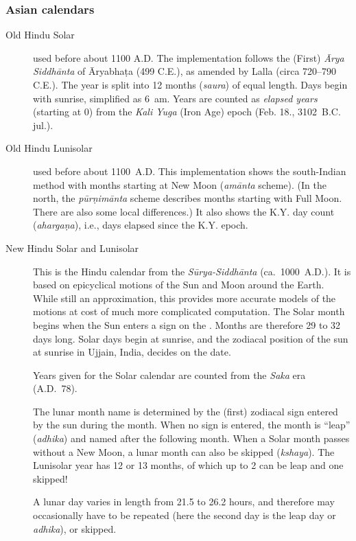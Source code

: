 \subsubsection{Asian calendars}
\begin{description}
\item[Old Hindu Solar] used before about 1100 A.D. The implementation
  follows the (First) \emph{\=Arya Siddh\=anta} of \=Aryabha\d{t}a
  (499 C.E.), as amended by Lalla (circa 720--790 C.E.).  The year is
  split into 12 months (\emph{saura}) of equal length.  Days begin
  with sunrise, simplified as 6~am. Years are counted as \emph{elapsed years} (starting at 0) from the
  \emph{Kali Yuga} (Iron Age) epoch (Feb. 18., 3102~B.C. jul.).
\item[Old Hindu Lunisolar] used before about 1100~A.D. 
  This implementation shows the south-Indian method 
  with months starting at New Moon (\emph{am\=anta} scheme). 
  (In the north, the \emph{p\=ur\d{n}im\=anta} scheme describes months 
  starting with Full Moon. There are also some local differences.) 
  It also shows the K.Y. day count (\emph{aharga\d{n}a}), i.e., days elapsed since the K.Y. epoch.
\item[New Hindu Solar and Lunisolar] This is the Hindu
  calendar from the \emph{S\=urya-Siddh\=anta}
  (ca.~1000~A.D.). It is based on epicyclical motions of the Sun and
  Moon around the Earth. While still an approximation, this provides
  more accurate models of the motions at cost of much more complicated
  computation.  The Solar month begins when the Sun enters a sign on
  the . Months are
  therefore 29 to 32 days long. Solar days begin at sunrise, and the
  zodiacal position of the sun at sunrise in Ujjain, India, decides on
  the date.

  Years given for the Solar calendar are counted from the \emph{Saka}
  era (A.D.~78).

  The lunar month name is determined by the (first) zodiacal sign
  entered by the sun during the month. When no sign is entered, the
  month is ``leap'' (\emph{adhika}) and named after the following
  month. When a Solar month passes without a New Moon, a lunar month
  can also be skipped (\emph{kshaya}).  The Lunisolar year has 12 or
  13 months, of which up to 2 can be leap and one skipped!

  A lunar day varies in length from 21.5 to 26.2 hours, and therefore
  may occasionally have to be repeated (here the second day is the
  leap day or \emph{adhika}), or skipped.


\end{description}
